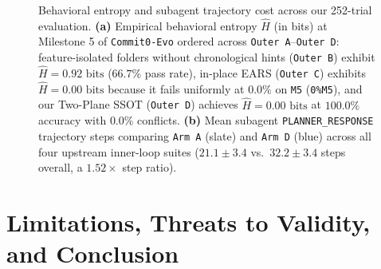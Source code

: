 \documentclass[11pt,a4paper,copyright]{google}
\begin{document}
\begin{figure}[htbp!]
\caption{Behavioral entropy and subagent trajectory cost across our 252-trial evaluation. \textbf{(a)} Empirical behavioral entropy $\hat{H}$ (in bits) at Milestone 5 of \texttt{Commit0-Evo} ordered across \texttt{Outer A}--\texttt{Outer D}: feature-isolated folders without chronological hints (\texttt{Outer B}) exhibit $\hat{H} = 0.92\text{ bits}$ ($66.7\%$ pass rate), in-place EARS (\texttt{Outer C}) exhibits $\hat{H} = 0.00\text{ bits}$ because it fails uniformly at $0.0\%$ on \texttt{M5} (\texttt{0\%M5}), and our Two-Plane SSOT (\texttt{Outer D}) achieves $\hat{H} = 0.00\text{ bits}$ at $100.0\%$ accuracy with $0.0\%$ conflicts. \textbf{(b)} Mean subagent \texttt{PLANNER\_RESPONSE} trajectory steps comparing \texttt{Arm A} (slate) and \texttt{Arm D} (blue) across all four upstream inner-loop suites ($21.1 \pm 3.4$ vs.\ $32.2 \pm 3.4$ steps overall, a $1.52\times$ step ratio).}
\label{fig:suite3_entropy_chart}
\end{figure}

\section{Limitations, Threats to Validity, and Conclusion}
\label{sec:conclusion}
\end{document}
